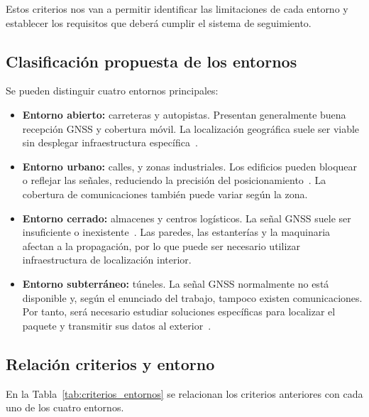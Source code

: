 \documentclass[11pt,a4paper]{article}
\begin{document}
Estos criterios nos van a permitir identificar las limitaciones de cada entorno y establecer los requisitos que deberá cumplir el sistema de seguimiento.

\subsection{Clasificación propuesta de los entornos}
\label{sec:apartado2_2}

Se pueden distinguir cuatro entornos principales:

\begin{itemize}
    \item \textbf{Entorno abierto:} carreteras y autopistas. Presentan generalmente buena recepción GNSS y cobertura móvil. La localización geográfica suele ser viable sin desplegar infraestructura específica~\cite{ref8}.

    \item \textbf{Entorno urbano:} calles, y zonas industriales. Los edificios pueden bloquear o reflejar las señales, reduciendo la precisión del posicionamiento~\cite{ref9}. La cobertura de comunicaciones también puede variar según la zona.

    \item \textbf{Entorno cerrado:} almacenes y centros logísticos. La señal GNSS suele ser insuficiente o inexistente~\cite{ref10}. Las paredes, las estanterías y la maquinaria afectan a la propagación, por lo que puede ser necesario utilizar infraestructura de localización interior.

    \item \textbf{Entorno subterráneo:} túneles. La señal GNSS normalmente no está disponible y, según el enunciado del trabajo, tampoco existen comunicaciones. Por tanto, será necesario estudiar soluciones específicas para localizar el paquete y transmitir sus datos al exterior~\cite{ref11}.
\end{itemize}

\subsection{Relación criterios y entorno}
\label{sec:apartado2_3}

En la Tabla~\ref{tab:criterios_entornos} se relacionan los criterios anteriores con cada uno de los cuatro entornos.
\end{document}
